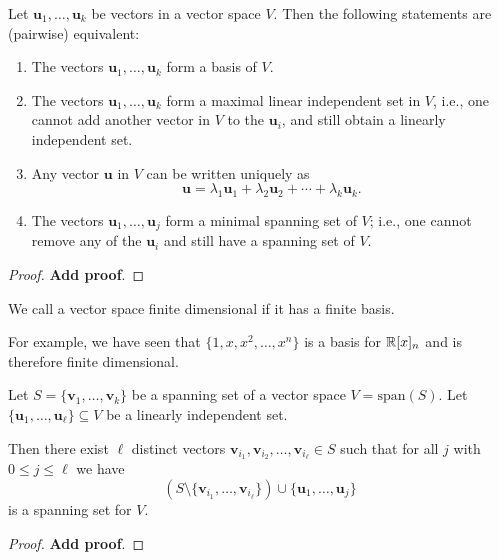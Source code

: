 \documentclass[10pt, a4paper]{article}
\newcommand{\mbf}[1]{\mathbf{#1}}
\begin{document}
\begin{theorem}\label{pre_linalg_thm_whatisabasis}
    Let $\mbf{u}_1, \dotsc, \mbf{u}_k$ be vectors in a vector space $V$.
    Then the following statements are
    (pairwise)
    equivalent:
    \begin{enumerate}[label = (\roman*)]
        \item The vectors $\mbf{u}_1, \dotsc, \mbf{u}_k$ form a basis of $V$.
        \item The vectors $\mbf{u}_1, \dotsc, \mbf{u}_k$ form a maximal linear independent set in $V$,
        i.e., one cannot add another vector in $V$ to the $\mbf{u}_i$,
        and still obtain a linearly independent set.
        \item Any vector $\mbf{u}$ in $V$ can be written uniquely as
        \[
        \mbf{u} = \lambda_1\mbf{u}_1 + \lambda_2\mbf{u}_2 + \dotsi + \lambda_k\mbf{u}_k.
        \]
        \item The vectors $\mbf{u}_1, \dotsc, \mbf{u}_j$ form a minimal spanning set of $V$;
        i.e., one cannot remove any of the $\mbf{u}_i$ and still have a spanning set of $V$.
    \end{enumerate}
    \begin{proof}
        \textbf{Add proof}.
    \end{proof}
\end{theorem}

We call a vector space finite dimensional if it has a finite basis.

For example,
we have seen that $\{1, x, x ^ 2, \dotsc, x ^ n\}$ is a basis for $\mathbb{R}[x]_n$ and is therefore finite dimensional.

\begin{theorem}
    Let $S = \{\mbf{v}_1, \dotsc, \mbf{v}_k\}$ be a spanning set of a vector space $V = \mathrm{span}(S)$.
    Let $\{\mbf{u}_1, \dotsc, \mbf{u}_{\ell}\} \subseteq V$ be a linearly independent set.

    Then there exist $\ell$ distinct vectors $\mbf{v}_{i_1}, \mbf{v}_{i_2}, \dotsc, \mbf{v}_{i_{\ell}} \in S$ such that for all $j$ with $0 \leq j \leq \ell$ we have
    \[
    (S \setminus \{\mbf{v}_{i_1}, \dotsc, \mbf{v}_{i_{\ell}}\}) \cup \{\mbf{u}_1, \dotsc, \mbf{u}_j\}
    \]
    is a spanning set for $V$.
    \begin{proof}
        \textbf{Add proof}.
    \end{proof}
\end{theorem}
\end{document}

